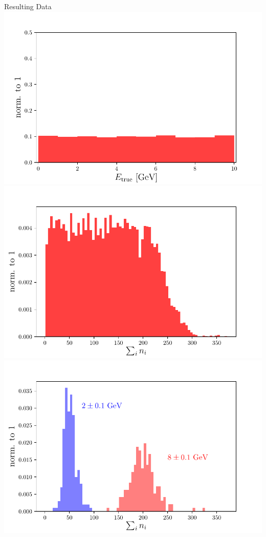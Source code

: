\documentclass[10pt]{beamer}
\begin{document}
\begin{frame}{Resulting Data}
\centering  \includegraphics[width=0.51 \textwidth]{../images/energy_distribution.pdf}
  \includegraphics[width=0.49 \textwidth]{../images/sumn_distribution.pdf}
  \includegraphics[width=0.49 \textwidth]{../images/sumn_e28_distribution.pdf}
\end{frame}
\end{document}
